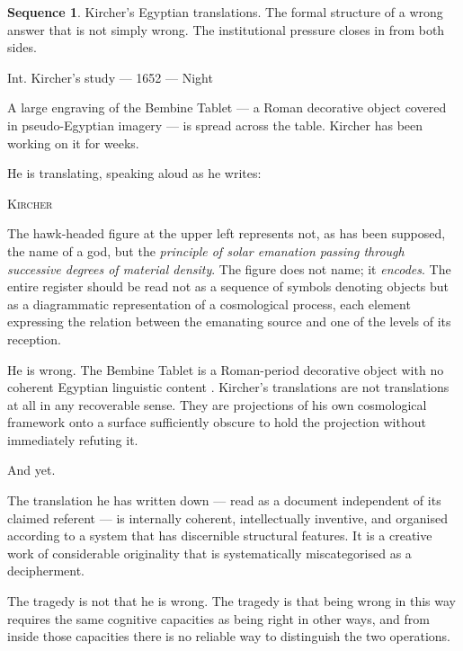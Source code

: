 \documentclass[12pt, a4paper, twoside]{memoir}
\theoremstyle{definition}
\newtheorem{sequence}{Sequence}[chapter]
\theoremstyle{remark}
\newenvironment{sceneheading}{%
  \vspace{8pt}%
  \noindent\begin{mdframed}[
    linecolor=arkgold,
    linewidth=0.8pt,
    leftmargin=0pt,
    rightmargin=0pt,
    innerleftmargin=6pt,
    innerrightmargin=6pt,
    innertopmargin=4pt,
    innerbottommargin=4pt,
    backgroundcolor=arkgold!6
  ]%
  \noindent\textsc\bgroup\small
}{%
  \egroup\end{mdframed}\vspace{4pt}%
}
\newenvironment{action}{%
  \vspace{4pt}%
  \noindent\begin{minipage}{\linewidth}%
  \setlength{\parindent}{0pt}%
  \itshape\color{kircherink}%
}{%
  \end{minipage}\vspace{6pt}%
}
\newenvironment{dialogue}[1]{%
  \vspace{6pt}%
  \noindent\hspace{24mm}%
  \begin{minipage}{0.6\linewidth}%
  \begin{center}%
  {\small\textsc{#1}}%
  \end{center}%
  \vspace{2pt}%
}{%
  \end{minipage}\vspace{6pt}%
}
\begin{document}
\begin{sequence}
\label{seq:hieroglyphs}
Kircher's Egyptian translations. The formal structure of a wrong answer that is not simply wrong. The institutional pressure closes in from both sides.
\end{sequence}

\begin{sceneheading}
Int. Kircher's study --- 1652 --- Night
\end{sceneheading}

\begin{action}
A large engraving of the Bembine Tablet --- a Roman decorative object covered in pseudo-Egyptian imagery --- is spread across the table. Kircher has been working on it for weeks.

He is translating, speaking aloud as he writes:
\end{action}

\begin{dialogue}{Kircher}
The hawk-headed figure at the upper left represents not, as has been supposed, the name of a god, but the \textit{principle of solar emanation passing through successive degrees of material density}. The figure does not name; it \textit{encodes}. The entire register should be read not as a sequence of symbols denoting objects but as a diagrammatic representation of a cosmological process, each element expressing the relation between the emanating source and one of the levels of its reception.
\end{dialogue}

\begin{action}
He is wrong. The Bembine Tablet is a Roman-period decorative object with no coherent Egyptian linguistic content \cite{iversen1961}. Kircher's translations are not translations at all in any recoverable sense. They are projections of his own cosmological framework onto a surface sufficiently obscure to hold the projection without immediately refuting it.

And yet.

The translation he has written down --- read as a document independent of its claimed referent --- is internally coherent, intellectually inventive, and organised according to a system that has discernible structural features. It is a creative work of considerable originality that is systematically miscategorised as a decipherment.

The tragedy is not that he is wrong. The tragedy is that being wrong in this way requires the same cognitive capacities as being right in other ways, and from inside those capacities there is no reliable way to distinguish the two operations.
\end{action}
\end{document}
